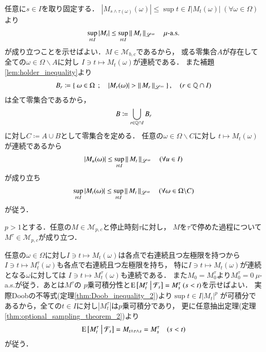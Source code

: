 	\begin{prf}
		任意に$s \in I$を取り固定する．
		$|M_{s \wedge \tau(\omega)}(\omega)| \leq \sup{t \in I}{|M_t(\omega)|}\ (\forall \omega \in \Omega)$より
		\begin{align}
			\operatorname*{sup}_{t \in I} |M_t| \leq \operatorname*{sup}_{t \in I} \left\|\, M_t\, \right\|_{\mathscr{L}^\infty}
			\quad \mbox{$\mu$-a.s.}
		\end{align}
		が成り立つことを示せばよい．$M \in \mathcal{M}_{b,c}$であるから，
		或る零集合$A$が存在して全ての$\omega \in \Omega \backslash A$に対し
		$I \ni t \longmapsto M_t(\omega)$が連続である．
		また補題\ref{lem:holder_inequality}より
		\begin{align}
			B_r \coloneqq \left\{\ \omega \in \Omega\ \, ; \quad |M_r(\omega)| > \left\|\, M_r\, \right\|_{\mathscr{L}^\infty}\ \right\},
			\quad (r \in \mathbb{Q} \cap I)
		\end{align}
		は全て零集合であるから，
		\begin{align}
			B \coloneqq \bigcup_{r \in \mathbb{Q} \cap I} B_r
		\end{align}
		に対し$C \coloneqq A \cup B$として零集合を定める．
		任意の$\omega \in \Omega \backslash C$に対し
		$t \longmapsto M_t(\omega)$が連続であるから
		\begin{align}
			|M_u(\omega)| \leq \operatorname*{sup}_{t \in I} \left\|\, M_t\, \right\|_{\mathscr{L}^\infty}
			\quad (\forall u \in I)
		\end{align}
		が成り立ち
		\begin{align}
			\operatorname*{sup}_{t \in I} |M_t(\omega)| \leq \operatorname*{sup}_{t \in I} \left\|\, M_t\, \right\|_{\mathscr{L}^\infty}
			\quad (\forall \omega \in \Omega \backslash C)
		\end{align}
		が従う．
		\QED
	\end{prf}
	
	\begin{screen}
		\begin{thm}[停止時刻で停めてもマルチンゲール]
			$p > 1$とする．任意の$M \in \mathcal{M}_{p,c}$と停止時刻$\tau$に対し，
			$M$を$\tau$で停めた過程について$M^\tau \in \mathcal{M}_{p,c}$が成り立つ．
			\label{thm:stopped_process_martingale}
		\end{thm}
	\end{screen}
	
	\begin{prf}
		任意の$\omega \in \Omega$に対し$I \ni t \longmapsto M_t(\omega)$は各点で右連続且つ左極限を持つから
		$I \ni t \longmapsto M^{\tau}_t(\omega)$も各点で右連続且つ左極限を持ち，
		特に$I \ni t \longmapsto M_t(\omega)$が連続となる$\omega$に対しては
		$I \ni t \longmapsto M^{\tau}_t(\omega)$も連続である．
		また$M_0 = M^{\tau}_0$より$M^{\tau}_0 = 0\ \mu$-a.s.が従う．あとは$M^{\tau}$の
		$p$乗可積分性と$\operatorname{E} \left[ M^\tau_t \ \middle|\ \mathcal{F}_s \right] = M^\tau_s\ (s < t)$を示せばよい．
		実際Doobの不等式(定理\ref{thm:Doob_inequality_2})より$\sup{t \in I}{|M_t|^p}$
		が可積分であるから，全ての$t \in I$に対し$\left| M^\tau_t \right|$は$p$乗可積分であり，
		更に任意抽出定理(定理\ref{thm:optional_sampling_theorem_2})より
		\begin{align}
			\operatorname{E} \left[ M^\tau_t \ \middle|\ \mathcal{F}_s \right] = M_{t \wedge \tau \wedge s} = M^\tau_s \quad (s < t)
		\end{align}
		が従う．
		\QED
	\end{prf}
	

